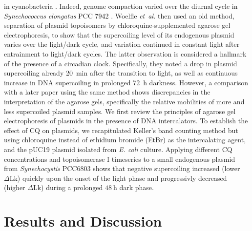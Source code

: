 \documentclass[10pt,a4]{article}
\newcommand{\scyst}{\textit{Synechocystis} PCC6803}
\newcommand{\dlk}{\ensuremath{\Delta\text{Lk}}}
\newcommand{\etal}{\textit{et~al.}}
\begin{document}
in cyanobacteria \cite{Mori2001}. Indeed, genome compaction varied
over the diurnal cycle in \textit{Synechococcus elongatus} PCC 7942
\cite{Smith2006}. Woelfle \etal{} \cite{Woelfle2007} then used an old
method, separation of plasmid topoisomers by chloroquine-supplemented
agarose gel electrophoresis, to show that the supercoiling level of
its endogenous plasmid varies over the light/dark cycle, and variation
continued in constant light after entrainment to light/dark
cycles. The latter observation is considered a hallmark of the
presence of a circadian clock.  Specifically, they noted a drop in
plasmid supercoiling already \SI{20}{\minute} after the transition to
light, as well as continuous increase in DNA supercoiling in prolonged
\SI{72}{\hour} darkness. However, a comparison with a later paper
using the same method \cite{Vijayan2009} shows discrepancies in the
interpretation of the agarose gels, specifically the relative
mobilities of more and less supercoiled plasmid samples.
%
We first review the principles of agarose gel electrophoresis of
plasmids in the presence of DNA intercalators.  To establish the
effect of CQ on plasmids, we recapitulated Keller's band counting
method but using chloroquine instead of ethidium bromide (EtBr) as the
intercalating agent, and the pUC19 plasmid isolated from
\textit{E. coli} culture. Applying different CQ concentrations and
topoisomerase I timeseries to a small endogenous plasmid from \scyst{}
shows that negative supercoiling increased (lower $\dlk$) quickly upon
the onset of the light phase and progressivly decreased (higher
$\dlk$) during a prolonged $\SI{48}{\hour}$ dark phase.



\section{Results and Discussion}
\end{document}
